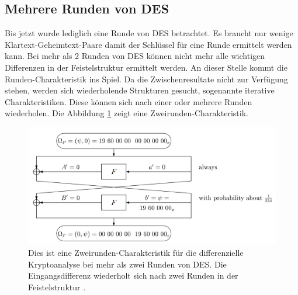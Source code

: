 \subsection{Mehrere Runden von DES}\label{subsec:Mehrere_Runden}
Bis jetzt wurde lediglich eine Runde von DES betrachtet. Es braucht nur wenige Klartext-Geheimtext-Paare damit der Schlüssel für eine Runde ermittelt werden kann. Bei mehr als 2 Runden von DES können nicht mehr alle wichtigen Differenzen in der Feistelstruktur ermittelt werden. 
An dieser Stelle kommt die Runden-Charakteristik ins Spiel. Da die Zwischenresultate nicht zur Verfügung stehen, werden sich wiederholende Strukturen gesucht, sogenannte iterative Charakteristiken. Diese können sich nach einer oder mehrere Runden wiederholen. Die Abbildung \ref{fig:Charakteristik} zeigt eine Zweirunden-Charakteristik. 

\begin{figure}[h]
	\centering
	\includegraphics[width=1.0\linewidth]{graphics/Charakteristik.png}
	\caption{Dies ist eine Zweirunden-Charakteristik für die differenzielle Kryptoanalyse bei mehr als zwei Runden von DES. Die Eingangsdifferenz wiederholt sich nach zwei Runden in der Feistelstruktur \cite{biham_differential_1990}.}
	\label{fig:Charakteristik}
\end{figure}

